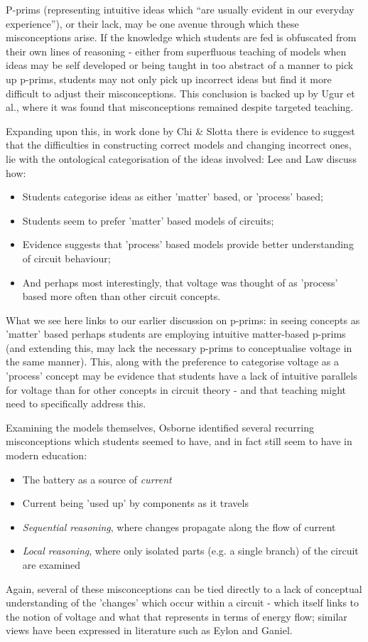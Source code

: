\documentclass[a4paper,openany,nobib]{tufte-book}
\begin{document}
P-prims (representing intuitive ideas which ``are usually evident in our everyday experience''), or their lack, may be one avenue through which these misconceptions arise. If the knowledge which students are fed is obfuscated from their own lines of reasoning - either from superfluous teaching of models when ideas may be self developed or being taught in too abstract of a manner to pick up p-prims, students may not only pick up incorrect ideas but find it more difficult to adjust their misconceptions. 
This conclusion is backed up by Ugur et {al.\autocite{ugur}}, where it was found that misconceptions remained despite targeted teaching.

Expanding upon this, in work done by Chi \& Slotta\autocite{slotta} there is evidence to suggest that the difficulties in constructing correct models and changing incorrect ones, lie with the ontological categorisation of the ideas involved: Lee and Law\autocite{lee2001} discuss how:
\begin{itemize}
	\item Students categorise ideas as either 'matter' based, or 'process' based;
	\item Students seem to prefer 'matter' based models of circuits;
	\item Evidence suggests that 'process' based models provide better understanding of circuit behaviour;
	\item And perhaps most interestingly, that voltage was thought of as 'process' based more often than other circuit concepts.
\end{itemize}
What we see here links to our earlier discussion on p-prims:
in seeing concepts as 'matter' based perhaps students are employing intuitive matter-based p-prims (and extending this, may lack the necessary p-prims to conceptualise voltage in the same manner). This, along with the preference to categorise voltage as a 'process' concept may be evidence that students have a lack of intuitive parallels for voltage than for other concepts in circuit theory - and that teaching might need to specifically address this.

Examining the models themselves, Osborne\autocite{osb} identified several recurring misconceptions which students seemed to have, and in fact still seem to {have in modern education\autocite{suryadi2020}}:
\begin{itemize}
	\item The battery as a source of \emph{current} 
	\item Current being 'used up' by components as it travels
	\item \emph{Sequential reasoning}, where changes propagate along the flow of current
	\item \emph{Local reasoning}, where only isolated parts (e.g. a single branch) of the circuit are examined
\end{itemize}
Again, several of these misconceptions can be tied directly to a lack of conceptual understanding of the 'changes' which occur within a circuit - which itself links to the notion of voltage and what that represents in terms of energy flow; similar views have been expressed in literature such as Eylon and {Ganiel\autocite{eylon1990}}.
\end{document}
